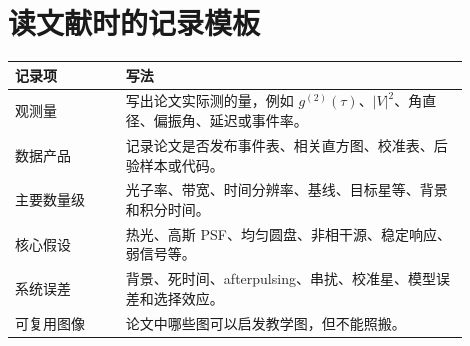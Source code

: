 \section{读文献时的记录模板}
\label{appsec:g-reading-template}

\begin{longtable}{p{0.22\linewidth}p{0.68\linewidth}}
\toprule
记录项 & 写法 \\
\midrule
观测量 & 写出论文实际测的量，例如 \(g^{(2)}(\tau)\)、\(|V|^2\)、角直径、偏振角、延迟或事件率。 \\
数据产品 & 记录论文是否发布事件表、相关直方图、校准表、后验样本或代码。 \\
主要数量级 & 光子率、带宽、时间分辨率、基线、目标星等、背景和积分时间。 \\
核心假设 & 热光、高斯 PSF、均匀圆盘、非相干源、稳定响应、弱信号等。 \\
系统误差 & 背景、死时间、afterpulsing、串扰、校准星、模型误差和选择效应。 \\
可复用图像 & 论文中哪些图可以启发教学图，但不能照搬。 \\
\bottomrule
\end{longtable}

